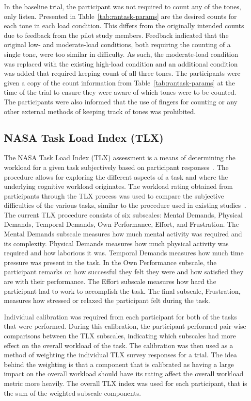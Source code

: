 \documentclass[11pt]{article}
\begin{document}
	In the baseline trial, the participant was not required to count any of the tones, only listen. Presented in Table~\ref{tab:rantask-params} are the desired counts for each tone in each load condition. This differs from the originally intended counts due to feedback from the pilot study members. Feedback indicated that the original low- and moderate-load conditions, both requiring the counting of a single tone, were too similar in difficulty. As such, the moderate-load condition was replaced with the existing high-load condition and an additional condition was added that required keeping count of all three tones. The participants were given a copy of the count information from Table~\ref{tab:rantask-params} at the time of the trial to ensure they were aware of which tones were to be counted. The participants were also informed that the use of fingers for counting or any other external methods of keeping track of tones was prohibited.
	
	\subsection{NASA Task Load Index (TLX)}
	The NASA Task Load Index (TLX) assessment is a means of determining the workload for a given task subjectively based on participant responses~\cite{NASA}. The procedure allows for exploring the different aspects of a task and where the underlying cognitive workload originates. The workload rating obtained from participants through the TLX process was used to compare the subjective difficulties of the various tasks, similar to the procedure used in existing studies~\cite{Ke, Estepp_2015}. The current TLX procedure consists of six subscales: Mental Demands, Physical Demands, Temporal Demands, Own Performance, Effort, and Frustration. The Mental Demands subscale measures how much mental activity was required and its complexity. Physical Demands measures how much physical activity was required and how laborious it was. Temporal Demands measures how much time pressure was present in the task. In the Own Performance subscale, the participant remarks on how successful they felt they were and how satisfied they are with their performance. The Effort subscale measures how hard the participant had to work to accomplish the task. The final subscale, Frustration, measures how stressed or relaxed the participant felt during the task. 
	
	Individual calibration was required from each participant for both of the tasks that were performed. During this calibration, the participant performed pair-wise comparisons between the TLX subscales, indicating which subscales had more effect on the overall workload of the task. The calibration was then used as a method of weighting the individual TLX survey responses for a trial. The idea behind the weighting is that a component that is calibrated as having a large impact on the overall workload should have its rating affect the overall workload metric more heavily. The overall TLX index was used for each participant, that is the sum of the weighted subscale components.
		
\end{document}
